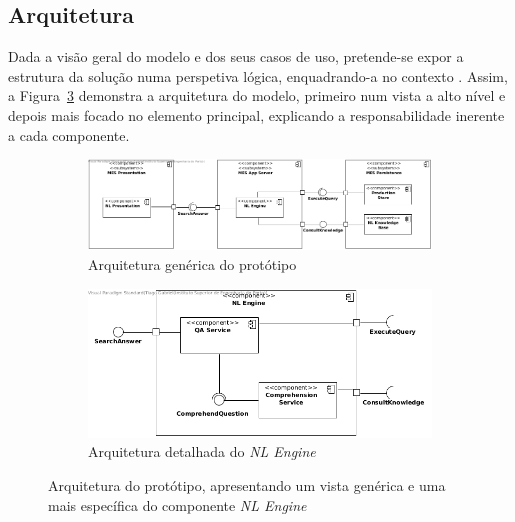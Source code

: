 \subsection{Arquitetura}
Dada a visão geral do modelo e dos seus casos de uso, pretende-se expor a estrutura da solução numa perspetiva lógica, enquadrando-a no contexto {\productname}. Assim, a Figura~\ref{fig:model_architecture} demonstra a arquitetura do modelo, primeiro num vista a alto nível e depois mais focado no elemento principal, explicando a responsabilidade inerente a cada componente.
%
\begin{figure}
\centering
    \begin{subfigure}{\textwidth}
         \centering
         \includegraphics[width=\textwidth]{ch04/assets/generic-architecture.jpg}
         \caption{Arquitetura genérica do protótipo}
         \label{fig:generic_architecture}
     \end{subfigure}
     \bigbreak
     \bigbreak
     \begin{subfigure}{\textwidth}
         \centering
         \includegraphics[width=.65\textwidth]{ch04/assets/nl-engine.jpg}
         \caption{Arquitetura detalhada do \textit{NL Engine}}
         \label{fig:nlengine_architecture}
     \end{subfigure}
\caption{Arquitetura do protótipo, apresentando um vista genérica e uma mais específica do componente \textit{NL Engine}}
\label{fig:model_architecture}
\end{figure}
%
